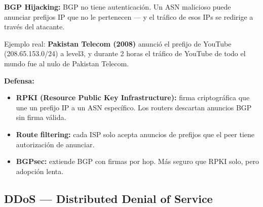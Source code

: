\begin{cuidado}
\textbf{BGP Hijacking:} BGP no tiene autenticación. Un ASN malicioso puede
anunciar prefijos IP que no le pertenecen --- y el tráfico de esos IPs
se redirige a través del atacante.

Ejemplo real: \textbf{Pakistan Telecom (2008)} anunció el prefijo de YouTube
(208.65.153.0/24) a level3, y durante 2 horas el tráfico de YouTube
de todo el mundo fue al nulo de Pakistan Telecom.

\textbf{Defensa:}
\begin{itemize}
    \item \textbf{RPKI (Resource Public Key Infrastructure):} firma criptográfica
          que une un prefijo IP a un ASN específico. Los routers descartan
          anuncios BGP sin firma válida.
    \item \textbf{Route filtering:} cada ISP solo acepta anuncios de prefijos
          que el peer tiene autorización de anunciar.
    \item \textbf{BGPsec:} extiende BGP con firmas por hop. Más seguro que RPKI
          solo, pero adopción lenta.
\end{itemize}
\end{cuidado}

\subsection{DDoS --- Distributed Denial of Service}


